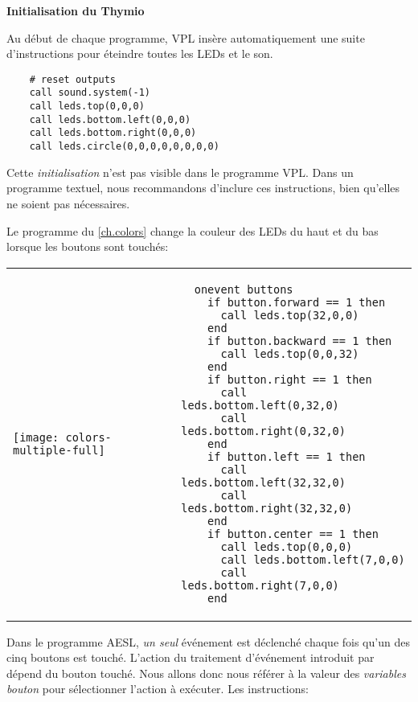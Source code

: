 \textbf{\large Initialisation du Thymio}

Au début de chaque programme,
VPL insère automatiquement une suite d'instructions 
pour éteindre toutes les LEDs et le son.

\begin{footnotesize}
\begin{verbatim}
    # reset outputs
    call sound.system(-1)
    call leds.top(0,0,0)
    call leds.bottom.left(0,0,0)
    call leds.bottom.right(0,0,0)
    call leds.circle(0,0,0,0,0,0,0,0)
\end{verbatim}
\end{footnotesize}

Cette \emph{initialisation} n'est pas visible dans le programme VPL.
Dans un programme textuel, nous recommandons d'inclure ces instructions,
bien qu'elles ne soient pas nécessaires.


Le programme  du \cref{ch.colors} change
la couleur des LEDs du haut et du bas lorsque les boutons sont touchés:

\begin{center}
\begin{tabular}{ll}
\texttt{[image: colors-multiple-full]} &
\begin{minipage}[b]{.5\textwidth}
\begin{footnotesize}
\begin{verbatim}
  onevent buttons
    if button.forward == 1 then
      call leds.top(32,0,0)
    end
    if button.backward == 1 then
      call leds.top(0,0,32)
    end
    if button.right == 1 then
      call leds.bottom.left(0,32,0)
      call leds.bottom.right(0,32,0)
    end
    if button.left == 1 then
      call leds.bottom.left(32,32,0)
      call leds.bottom.right(32,32,0)
    end
    if button.center == 1 then
      call leds.top(0,0,0)
      call leds.bottom.left(7,0,0)
      call leds.bottom.right(7,0,0)
    end
\end{verbatim}
\end{footnotesize}
\vspace*{5ex}
\end{minipage}
\end{tabular}
\end{center}

Dans le programme AESL, \emph{un seul} événement est déclenché chaque fois qu'un des cinq boutons
est touché.
L'action du traitement d'événement introduit par 
dépend du bouton touché. Nous allons donc nous référer à la valeur des \emph{variables bouton}
pour sélectionner l'action à exécuter.
Les instructions:

